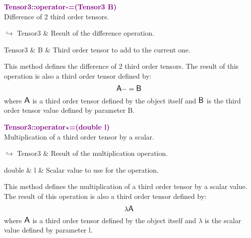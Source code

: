 \textcolor{purple}{\textbf{Tensor3::operator-=(Tensor3 B)}}\label{Tensor3::operator-=(Tensor3 B)}\\
Difference of 2 third order tensors.\vspace*{-0.5em}
\begin{tcolorbox}[grow to left by=-1cm, width=\textwidth-1cm,myArgs,tabularx={l|R}]
$\hookrightarrow$ Tensor3 & Result of the difference operation.
\end{tcolorbox}

\begin{tcolorbox}[width=\textwidth,myArgs,tabularx={ll|R}]
Tensor3 & B & Third order tensor to add to the current one.
\end{tcolorbox}

This method defines the difference of 2 third order tensors.
The result of this operation is also a third order tensor defined by:
\begin{equation*}
\mbox{\large\ensuremath{\mathsf{A}}} -= \mbox{\large\ensuremath{\mathsf{B}}}
\end{equation*}
where $\mbox{\large\ensuremath{\mathsf{A}}}$ is a third order tensor defined by the object itself and $\mbox{\large\ensuremath{\mathsf{B}}}$ is the third order tensor value defined by parameter B.

\textcolor{purple}{\textbf{Tensor3::operator$\star$=(double l)}}\label{Tensor3::operator*=(double l)}\\
Multiplication of a third order tensor by a scalar.\vspace*{-0.5em}
\begin{tcolorbox}[grow to left by=-1cm, width=\textwidth-1cm,myArgs,tabularx={l|R}]
$\hookrightarrow$ Tensor3 & Result of the multiplication operation.
\end{tcolorbox}

\begin{tcolorbox}[width=\textwidth,myArgs,tabularx={ll|R}]
double & l & Scalar value to use for the operation.
\end{tcolorbox}

This method defines the multiplication of a third order tensor by a scalar value.
The result of this operation is also a third order tensor defined by:
\begin{equation*}
\lambda \mbox{\large\ensuremath{\mathsf{A}}}
\end{equation*}
where $\mbox{\large\ensuremath{\mathsf{A}}}$ is a third order tensor defined by the object itself and $\lambda$ is the scalar value defined by parameter l.

